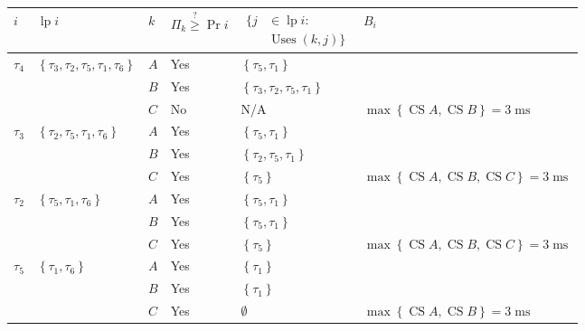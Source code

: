 \documentclass{article}
\numberwithin{equation}{section}
\numberwithin{table}{section}
\numberwithin{figure}{section}
\DeclareMathOperator\mls{ms}
\DeclareMathOperator\lp{lp}
\DeclareMathOperator\cs{CS}
\DeclareMathOperator\uses{Uses}
\begin{document}
\begin{enumerate}
        \begin{table}[p]
            \centering%
            \begin{tabular}{llllll}
                $i$ &
                    $\lp{i}$ &
                    $k$ &
                    $\Pi_k \stackrel{?}{\geq}
                    \Pr{i}$ &
                    {$\!\begin{aligned}
                        \{ j &\in \lp{i} \colon \\[-.5ex] &\uses{(k,j)} \}
                    \end{aligned}$} &
                    $B_i$ \\
                \toprule
                $\tau_4$ & $\left\{ \tau_3, \tau_2, \tau_5, \tau_1, \tau_6
                    \right\}$ & $A$ & Yes & $\left\{ \tau_5, \tau_1 \right\}$ \\
                & & $B$ & Yes & $\left\{ \tau_3, \tau_2, \tau_5, \tau_1
                    \right\}$ \\
                & & $C$ & No & N/A & $\max\left\{ \cs{A}, \cs{B} \right\} =
                    3\mls$ \\
                \midrule
                $\tau_3$ & $\left\{ \tau_2, \tau_5, \tau_1, \tau_6 \right\}$ &
                    $A$ & Yes & $\left\{ \tau_5, \tau_1 \right\}$ \\
                & & $B$ & Yes & $\left\{ \tau_2, \tau_5, \tau_1 \right\}$ \\
                & & $C$ & Yes & $\left\{ \tau_5 \right\}$ & $\max\left\{
                    \cs{A}, \cs{B}, \cs{C} \right\} = 3\mls$ \\
                \midrule
                $\tau_2$ & $\left\{ \tau_5, \tau_1, \tau_6 \right\}$ & $A$ &
                    Yes & $\left\{ \tau_5, \tau_1 \right\}$ \\
                & & $B$ & Yes & $\left\{ \tau_5, \tau_1 \right\}$ \\
                & & $C$ & Yes & $\left\{ \tau_5 \right\}$ &
                    $\max\left\{ \cs{A}, \cs{B}, \cs{C} \right\} = 3\mls$ \\
                \midrule
                $\tau_5$ & $\left\{ \tau_1, \tau_6 \right\}$ & $A$ & Yes &
                    $\left\{ \tau_1 \right\}$ \\
                & & $B$ & Yes & $\left\{ \tau_1 \right\}$ \\
                & & $C$ & Yes & $\emptyset$ & $\max\left\{ \cs{A}, \cs{B}
                    \right\} = 3\mls$ \\

\end{tabular}
\end{table}
\end{enumerate}
\end{document}
